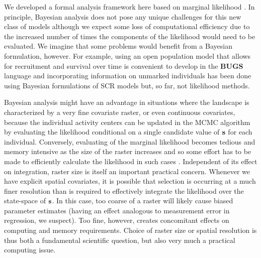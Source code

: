 \documentclass[12pt]{article}
\begin{document}
We developed a formal analysis framework here based on marginal
likelihood \citep{borchers_efford:2008}.  In principle, Bayesian
analysis does not pose any unique challenges for this new class of
models although we expect some loss of computational efficiency due to
the increased number of times the components of the likelihood would
need to be evaluated.  We imagine that some problems would benefit
from a Bayesian formulation, however. For example, using an open
population model that allows for recruitment and survival over time
\citep{gardner_etal:2010ecol} is convenient to develop in the {\bf
  BUGS} language and incorporating information on unmarked individuals
has been done using Bayesian formulations of SCR models
\citep{chandler_royle:2012, sollmann_etal:inprepjapplecol} but, so far, not
likelihood methods.

Bayesian analysis might have an advantage in situations where the
landscape is characterized by a very fine covariate raster, or even
continuous covariates, because the individual activity centers can be
updated in the MCMC algorithm by evaluating the likelihood conditional
on a single candidate value of ${\bf s}$ for each individual.
Conversely, evaluating of the marginal likelihood becomes tedious and
memory intensive as the size of the raster increases and so some
effort has to be made to efficiently calculate the likelihood in such
cases \citep[e.g., see][]{warton_shepherd:2010}. Independent of its
effect on integration, raster size is itself an important practical
concern.
Whenever we have explicit spatial covariates, it is possible that
selection is occurring at a much finer resolution than is required to
effectively integrate the likelihood over the state-space of ${\bf
  s}$. In this case, too coarse of a raster will likely cause biased
parameter estimates (having an effect analogous to measurement error
in regression, we suspect). Too fine, however, creates concomitant
effects on computing and memory requirements.  Choice of raster size
or spatial resolution is thus both a fundamental scientific question,
but also very much a practical computing issue.
\end{document}
